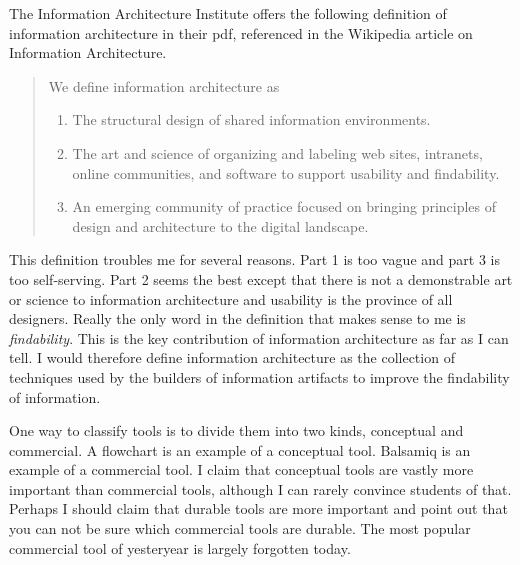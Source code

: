 \hypertarget{information-architecture}{%
\label{information-architecture}}

The Information Architecture Institute offers the following definition
of information architecture in their pdf, referenced in the Wikipedia
article on Information Architecture.

\begin{quotation}
  We define information architecture as
  \begin{enumerate}
  \item The structural design of shared information environments.
  \item The art and science of organizing and labeling web sites, intranets, online communities, and software to support usability and findability.
  \item An emerging community of practice focused on bringing principles of design and architecture to the digital landscape.
  \end{enumerate}
\end{quotation}

This definition troubles me for several reasons. Part 1 is too vague and
part 3 is too self-serving. Part 2 seems the best except that there is
not a demonstrable art or science to information architecture and
usability is the province of all designers. Really the only word in the
definition that makes sense to me is \emph{findability}. This is the key
contribution of information architecture as far as I can tell. I would
therefore define information architecture as the collection of
techniques used by the builders of information artifacts to improve the
findability of information.

\hypertarget{information-architecture-tools}{%
\label{information-architecture-tools}}

One way to classify tools is to divide them into two kinds, conceptual
and commercial. A flowchart is an example of a conceptual tool. Balsamiq
is an example of a commercial tool. I claim that conceptual tools are
vastly more important than commercial tools, although I can rarely
convince students of that. Perhaps I should claim that durable tools are
more important and point out that you can not be sure which commercial
tools are durable. The most popular commercial tool of yesteryear is
largely forgotten today.

